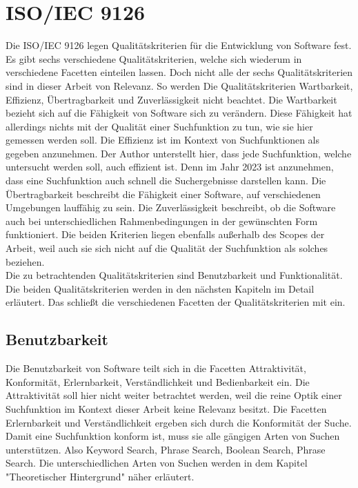 \section{ISO/IEC 9126}
Die ISO/IEC 9126 legen Qualitätskriterien für die Entwicklung von Software fest.
Es gibt sechs verschiedene Qualitätskriterien, welche sich wiederum in verschiedene Facetten einteilen lassen.
Doch nicht alle der sechs Qualitätskriterien sind in dieser Arbeit von Relevanz.
So werden Die Qualitätskriterien Wartbarkeit, Effizienz, Übertragbarkeit und Zuverlässigkeit nicht beachtet.
Die Wartbarkeit bezieht sich auf die Fähigkeit von Software sich zu verändern.
Diese Fähigkeit hat allerdings nichts mit der Qualität einer Suchfunktion zu tun, wie sie hier gemessen werden soll.
Die Effizienz ist im Kontext von Suchfunktionen als gegeben anzunehmen.
Der Author unterstellt hier, dass jede Suchfunktion, welche untersucht werden soll, auch effizient ist.
Denn im Jahr 2023 ist anzunehmen, dass eine Suchfunktion auch schnell die Suchergebnisse darstellen kann.
Die Übertragbarkeit beschreibt die Fähigkeit einer Software, auf verschiedenen Umgebungen lauffähig zu sein.
Die Zuverlässigkeit beschreibt, ob die Software auch bei unterschiedlichen Rahmenbedingungen in der gewünschten Form funktioniert.
Die beiden Kriterien liegen ebenfalls außerhalb des Scopes der Arbeit, weil auch sie sich nicht auf die Qualität der Suchfunktion als solches beziehen.\\

Die zu betrachtenden Qualitätskriterien sind Benutzbarkeit und Funktionalität.
Die beiden Qualitätskriterien werden in den nächsten Kapiteln im Detail erläutert.
Das schließt die verschiedenen Facetten der Qualitätskriterien mit ein.

\subsection{Benutzbarkeit}
Die Benutzbarkeit von Software teilt sich in die Facetten Attraktivität, Konformität, Erlernbarkeit, Verständlichkeit und Bedienbarkeit ein.
Die Attraktivität soll hier nicht weiter betrachtet werden, weil die reine Optik einer Suchfunktion im Kontext dieser Arbeit keine Relevanz besitzt.
Die Facetten Erlernbarkeit und Verständlichkeit ergeben sich durch die Konformität der Suche.
Damit eine Suchfunktion konform ist, muss sie alle gängigen Arten von Suchen unterstützen.
Also Keyword Search, Phrase Search, Boolean Search, Phrase Search.
Die unterschiedlichen Arten von Suchen werden in dem Kapitel "Theoretischer Hintergrund" näher erläutert.\\

